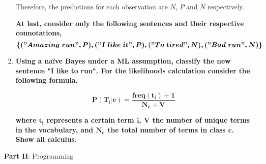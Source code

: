 \documentclass[12pt]{article}
\begin{document}
\begin{enumerate}[leftmargin=\labelsep]
    \vspace{10pt}
    Therefore, the predictions for each observation are $N$, $P$ and $N$ respectively.

    \vspace{10pt}

    \textbf{At last, consider only the following sentences and their respective connotations,}
    \[
    \boldsymbol{\{("Amazing\; run", P), ("I\; like\; it", P), ("To\; tired", N), ("Bad\; run", N)\}}
    \]

    \item \textbf{Using a naïve Bayes under a ML assumption, classify the new sentence
    "I like to run". For the likelihoods calculation consider the following formula,}

    \begin{equation*}
        \boldsymbol{P(T_i|c) = \frac{freq(t_i) + 1}{N_c + V}}
    \end{equation*}

    \textbf{where $\mathbf{t_i}$ represents a certain term $\mathbf{i}$, $\mathbf{V}$ the number of unique terms in the vocabulary, and
    $\mathbf{N_c}$ the total number of terms in class $\mathbf{c}$. Show all calculus.}

    
\end{enumerate}

\vspace{10pt}

\large{\textbf{Part II}: Programming}\normalsize
\end{document}
